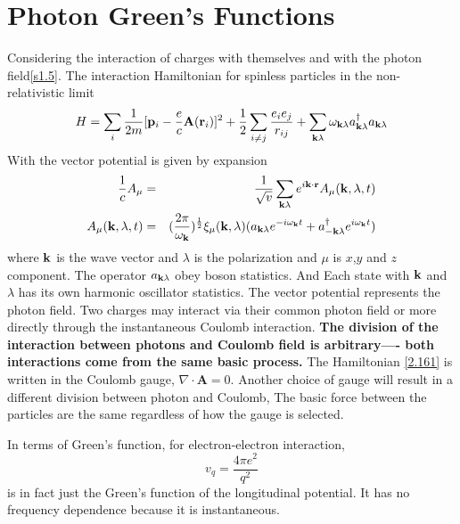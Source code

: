 \section{Photon Green's Functions}\label{s2.10}
Considering the interaction of charges with themselves and with the photon field\ref{s1.5}.
The interaction Hamiltonian for spinless particles in the non-relativistic limit
\begin{equation}
  H=\sum_i \frac{1}{2m}[\mathbf{p}_i - \frac{e}{c} \mathbf{A}(\mathbf{r}_i)]^2 + \frac{1}{2} \sum_{i\neq j}\frac{e_i e_j}{r_{ij}} + \sum_{\mathbf{k} \lambda} \omega_{\mathbf{k} \lambda} a^\dagger_{\mathbf{k} \lambda} a_{\mathbf{k} \lambda} \label{2.161}
\end{equation}
With the vector potential is given by expansion\begin{eqnarray}
  \frac{1}{c}A_\mu &=& \frac{1}{\sqrt{v}} \sum_{\mathbf{k}\lambda}e^{i\mathbf{k}\cdot \mathbf{r}}A_\mu (\mathbf{k},\lambda,t) \label{2.162} \\
  A_\mu(\mathbf{k},\lambda,t) &=& (\frac{2\pi}{\omega_{\mathbf{k}}})^{\frac{1}{2}} \xi_\mu(\mathbf{k} ,\lambda) (a_{\mathbf{k}\lambda}e^{-i\omega_{\mathbf{k}} t} +a_{-\mathbf{k} \lambda}^\dagger e^{i\omega_{\mathbf{k}} t}) \label{2.163}
\end{eqnarray}
where $\mathbf{k}$ is the wave vector and $\lambda$ is the polarization and $\mu$ is $x$,$y$ and $z$ component.
The operator $a_{\mathbf{k}\lambda}$ obey boson statistics.
And Each state with $\mathbf{k}$ and $\lambda$  has its own harmonic oscillator statistics.
The vector potential represents the photon field.
Two charges may interact via their common photon field or more directly through the instantaneous Coulomb interaction.
\textbf{The division of the interaction between photons and Coulomb field is arbitrary---- both interactions come from the same basic process.}
The Hamiltonian \eqref{2.161} is written in the Coulomb gauge, $\nabla \cdot \mathbf{A}=0$.
Another choice of gauge will result in a different division between photon and Coulomb,
The basic force between the particles are the same regardless of how the gauge is selected.

In terms of Green's function, for electron-electron interaction,
\begin{equation}
  v_q = \frac{4\pi e^2}{q^2} \label{2.165}
\end{equation}
is in fact just the Green's function of the longitudinal potential.
It has no frequency dependence because it is instantaneous.

